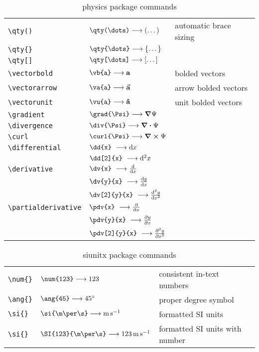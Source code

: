 \begin{table*}
        \centering
        \caption{physics package commands}
        \label{tab:PhysicsCommands}
        \begin{tabular}{lll}
            \verb|\qty()| & $\verb|\qty(\dots)| \longrightarrow \qty(\dots)$ & automatic brace sizing \\
            \verb|\qty{}| & $\verb|\qty{\dots}| \longrightarrow \qty{\dots}$ & \\
            \verb|\qty[]| & $\verb|\qty[\dots]| \longrightarrow \qty[\dots]$ & \\
            \verb|\vectorbold| & $\verb|\vb{a}| \longrightarrow \vb{a}$ & bolded vectors \\
            \verb|\vectorarrow| & $\verb|\va{a}| \longrightarrow \va{a}$ & arrow bolded vectors \\
            \verb|\vectorunit| & $\verb|\vu{a}| \longrightarrow \vu{a}$ & unit bolded vectors \\
            \verb|\gradient| & $\verb|\grad{\Psi}| \longrightarrow \grad{\Psi}$ &  \\
            \verb|\divergence| & $\verb|\div{\Psi}| \longrightarrow \div{\Psi}$ &  \\
            \verb|\curl| & $\verb|\curl{\Psi}| \longrightarrow \curl{\Psi}$ &  \\
            \verb|\differential| & $\verb|\dd{x}|\ \longrightarrow \dd{x}$ & \\
            & $\verb|\dd[2]{x}|\ \longrightarrow \dd[2]{x}$ & \\
             \verb|\derivative| & $\verb|\dv{x}|\ \longrightarrow \dv{x}$ & \\
            & $\verb|\dv{y}{x}|\ \longrightarrow \dv{y}{x}$ & \\
            & $\verb|\dv[2]{y}{x}|\ \longrightarrow \dv[2]{y}{x}$ & \\
            \verb|\partialderivative| & $\verb|\pdv{x}|\ \longrightarrow \pdv{x}$ & \\
            & $\verb|\pdv{y}{x}|\ \longrightarrow \pdv{y}{x}$ & \\
            & $\verb|\pdv[2]{y}{x}|\ \longrightarrow \pdv[2]{y}{x}$ & \\
        \end{tabular}
    \end{table*}
% 
\begin{table*}
        \centering
        \caption{siunitx package commands}
        \label{tab:SiunitxCommands}
        \begin{tabular}{lll}
            \verb|\num{}| & $\verb|\num{123}| \longrightarrow \num{123}$ & consistent in-text numbers \\
            \verb|\ang{}| & $\verb|\ang{45}| \longrightarrow \ang{45}$ & proper degree symbol \\
            \verb|\si{}| & $\verb|\si{\m\per\s}| \longrightarrow \si{\m\per\s}$ & formatted SI units \\
            \verb|\si{}| & $\verb|\SI{123}{\m\per\s}| \longrightarrow \SI{123}{\m\per\s}$ & formatted SI units with number \\
        \end{tabular}
    \end{table*}
% 
